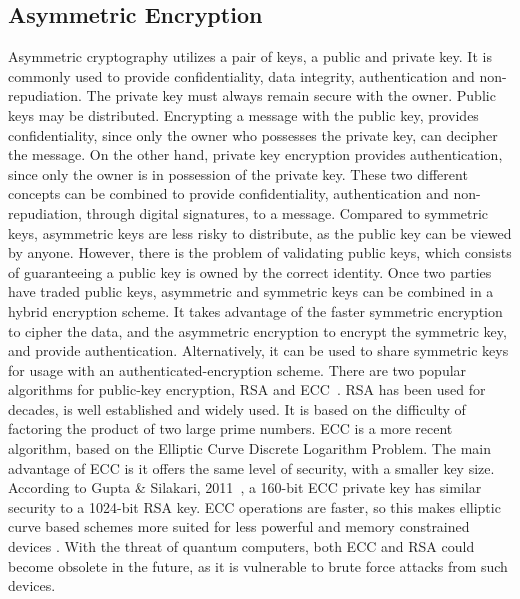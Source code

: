 \subsection{Asymmetric Encryption}\label{chap:background:crypto:assymetric}

Asymmetric cryptography utilizes a pair of keys, a public and private key. It is commonly used to provide confidentiality, data integrity, authentication and non-repudiation.
The private key must always remain secure with the owner. Public keys may be distributed. Encrypting a message with the public key, provides confidentiality, since only the owner who possesses the private key, can decipher the message. On the other hand, private key encryption provides authentication, since only the owner is in possession of the private key. These two different concepts can be combined to provide confidentiality, authentication and non-repudiation, through digital signatures, to a message.
Compared to symmetric keys, asymmetric keys are less risky to distribute, as the public key can be viewed by anyone. However, there is the problem of validating public keys, which consists of guaranteeing a public key is owned by the correct identity.
Once two parties have traded public keys, asymmetric and symmetric keys can be combined in a hybrid encryption scheme. It takes advantage of the faster symmetric encryption to cipher the data, and the asymmetric encryption to encrypt the symmetric key, and provide authentication. Alternatively, it can be used to share symmetric keys for usage with an authenticated-encryption scheme.
There are two popular algorithms for public-key encryption, \ac{RSA} and \ac{ECC}~\cite{mahto2016security}.
\ac{RSA} has been used for decades, is well established and widely used. It is based on the difficulty of factoring the product of two large prime numbers.
\ac{ECC} is a more recent algorithm, based on the Elliptic Curve Discrete Logarithm Problem. The main advantage of \ac{ECC} is it offers the same level of security, with a smaller key size. According to Gupta \& Silakari, 2011~\cite{eccoverrsa}, a 160-bit \ac{ECC} private key has similar security to a 1024-bit \ac{RSA} key.
\ac{ECC} operations are faster, so this makes elliptic curve based schemes more suited for less powerful and memory constrained devices \cite{selvakumaraswamy2016efficient}.
With the threat of quantum computers, both \ac{ECC} and \ac{RSA} could become obsolete in the future, as it is vulnerable to brute force attacks from such devices.

